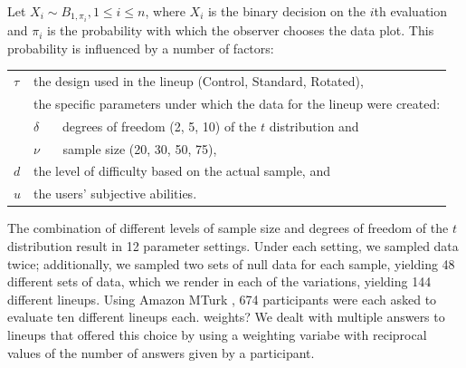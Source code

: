 \documentclass{article}\usepackage[]{graphicx}\usepackage[]{color}
\newcommand{\hh}[1]{{\color{magenta} #1}}
\begin{document}
Let $X_i \sim B_{1, \pi_i}, 1 \le i \le n$, where $X_i$ is the binary decision on the $i$th evaluation and $\pi_i$ is the probability with which the observer chooses the data plot. This probability is influenced by a number of factors:

\begin{center}
\begin{tabular}{lp{5in}}
$\tau$ & the design used in the lineup (Control, Standard, Rotated), \\
&  the specific parameters under which the data for the lineup were created: \\
&  $\delta$ \ \ \ degrees of freedom (2, 5, 10) {of the $t$ distribution} and \\
&  $\nu$  \ \ \ sample size (20, 30, 50, 75), \\
$d$ &  the level of difficulty based on the actual sample, and \\
$u$ & the users' subjective abilities.
 \end{tabular}
\end{center}
%

%
The combination of different levels of sample size and degrees of freedom of the $t$ distribution result in 12 parameter settings. Under each setting, we sampled data twice; additionally, we sampled two sets of null data for each sample, yielding 48 different sets of data, which we render in each of the variations, yielding 144 different lineups. 
Using  Amazon MTurk \citep{amazon}, 674 participants were each asked to evaluate ten different lineups each. 
\hh{weights? We dealt with multiple answers to lineups that offered this choice by using a weighting variabe with reciprocal values of the number of answers given by a participant.}
\end{document}
